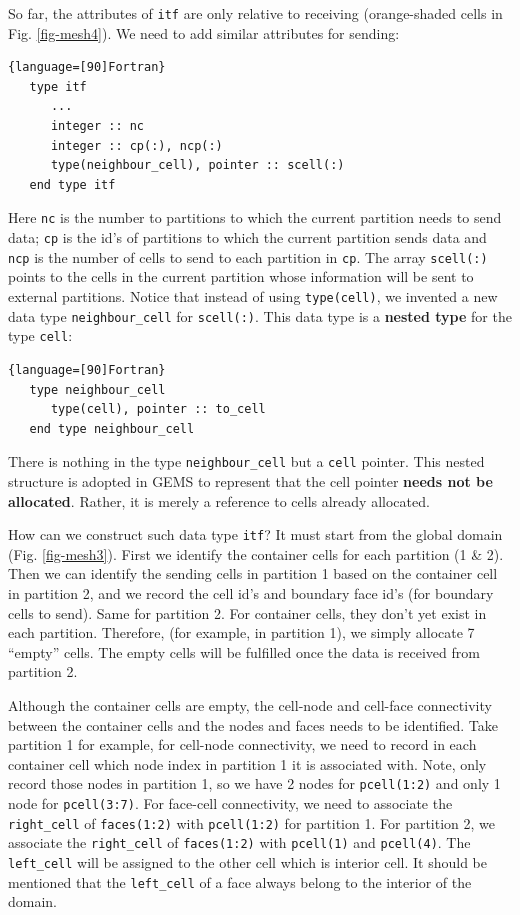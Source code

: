 \documentclass[11pt, letterpaper]{report}
\begin{document}
So far, the attributes of \verb+itf+ are only relative to receiving (orange-shaded cells in Fig. \ref{fig-mesh4}). We need to add similar attributes for sending:

\begin{lstlisting}{language=[90]Fortran}
   type itf
      ...
      integer :: nc
      integer :: cp(:), ncp(:)
      type(neighbour_cell), pointer :: scell(:)
   end type itf
\end{lstlisting}

Here \verb+nc+ is the number to partitions to which the current partition needs to send data;
\verb+cp+ is the id's of partitions to which the current partition sends data and \verb+ncp+ is the
number of cells to send to each partition in \verb+cp+. The array \verb+scell(:)+ points to the
cells in the current partition whose information will be sent to external partitions. Notice that
instead of using \verb+type(cell)+, we invented a new data type \verb+neighbour_cell+ for
\verb+scell(:)+. This data type is a {\bf nested type} for the type \verb+cell+:

\begin{lstlisting}{language=[90]Fortran}
   type neighbour_cell
      type(cell), pointer :: to_cell
   end type neighbour_cell
\end{lstlisting}

There is nothing in the type \verb+neighbour_cell+ but a \verb+cell+ pointer. This nested structure
is adopted in GEMS to represent that the cell pointer {\bf needs not be allocated}. Rather, it is
merely a reference to cells already allocated.
\paraspace

How can we construct such data type \verb+itf+? It must start from the global domain (Fig.
\ref{fig-mesh3}). First we identify the container cells for each partition (1 \& 2). Then we can
identify the sending cells in partition 1 based on the container cell in partition 2, and we record
the cell id's and boundary face id's (for boundary cells to send). Same for partition 2. For
container cells, they don't yet exist in each partition. Therefore, (for example, in partition 1), we simply
allocate 7 ``empty'' cells. The empty cells will be fulfilled once the data is received from
partition 2.
\paraspace

Although the container cells are empty, the cell-node and cell-face connectivity between the
container cells and the nodes and faces needs to be identified. Take partition 1 for example, for
cell-node connectivity, we need to record in each container cell which node index in partition 1 it
is associated with. Note, only record those nodes in partition 1, so we have 2 nodes for
\verb+pcell(1:2)+ and only 1 node for \verb+pcell(3:7)+. For face-cell connectivity, we need to
associate the \verb+right_cell+ of \verb+faces(1:2)+ with \verb+pcell(1:2)+ for partition 1. For
partition 2, we associate the \verb+right_cell+ of \verb+faces(1:2)+ with \verb+pcell(1)+ and
\verb+pcell(4)+. The \verb+left_cell+ will be assigned to the other cell which is interior cell. It
should be mentioned that the \verb+left_cell+ of a face always belong to the interior of the domain.
\paraspace
\end{document}
